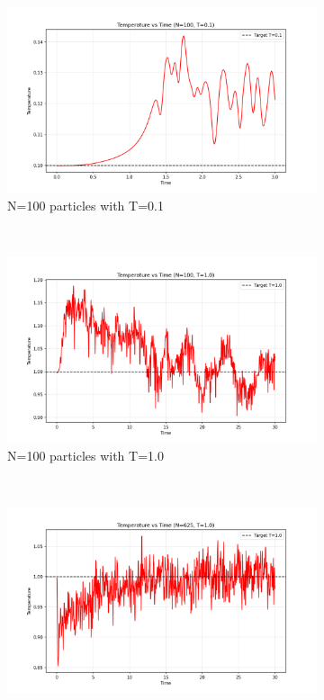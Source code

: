 \begin{figure}[H]
	\centering
	\begin{subfigure}{0.5\textwidth}
		\includegraphics[width=\textwidth]{media/temp_N100_T0.1.png}
		\caption{N=100 particles with T=0.1}
		\label{sfig:nvt_temp_N100_T01}
	\end{subfigure}%
	~
	\begin{subfigure}{0.5\textwidth}
		\includegraphics[width=\textwidth]{media/temp_N100_T1.0.png}
		\caption{N=100 particles with T=1.0}
		\label{sfig:nvt_temp_N100_T10}
	\end{subfigure}%
	\\
	\begin{subfigure}{0.5\textwidth}
		\includegraphics[width=\textwidth]{media/temp_N625_T1.0.png}

\end{subfigure}
\end{figure}

